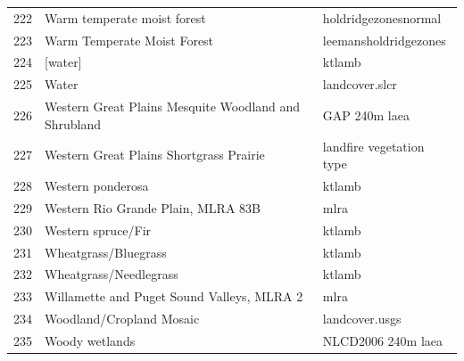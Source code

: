 \begin{frame}
\begin{tabular}{c l l}
222 & Warm temperate moist forest & holdridgezonesnormal \\
223 & Warm Temperate Moist Forest & leemansholdridgezones \\
224 & [water] & ktlamb \\
225 & Water & landcover.slcr \\
226 & Western Great Plains Mesquite Woodland and Shrubland & GAP 240m laea \\
227 & Western Great Plains Shortgrass Prairie & landfire vegetation type \\
228 & Western ponderosa & ktlamb \\
229 & Western Rio Grande Plain, MLRA 83B & mlra \\
230 & Western spruce/Fir & ktlamb \\
231 & Wheatgrass/Bluegrass & ktlamb \\
232 & Wheatgrass/Needlegrass & ktlamb \\
233 & Willamette and Puget Sound Valleys, MLRA 2 & mlra \\
234 & Woodland/Cropland Mosaic & landcover.usgs \\
235 & Woody wetlands & NLCD2006 240m laea \\
 \end{tabular}
\end{frame}

